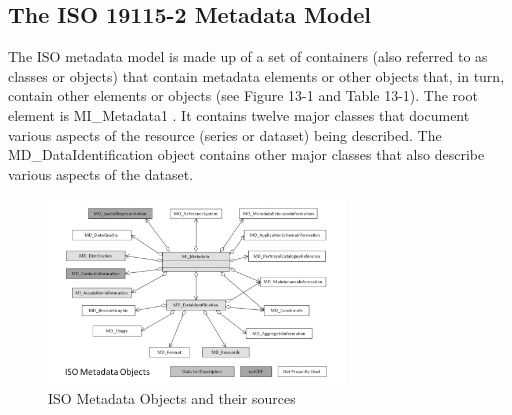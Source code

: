 \subsection{The ISO 19115-2 Metadata Model}
The ISO metadata model is made up of a set of containers (also referred to as classes or objects)
that contain metadata elements or other objects that, in turn, contain other elements or objects (see
Figure 13-1 and Table 13-1). The root element is MI\_Metadata1 \footnotemark{}
. It contains twelve major classes that document
various aspects of the resource (series or dataset) being described. The MD\_DataIdentification object
contains other major classes that also describe various aspects of the dataset.
\newp {}

\begin{figure}[H]
\centering
\includegraphics[width=0.7\textwidth]{../images/iso_metadata_obj.png}
\caption{ISO Metadata Objects and their sources}
\label{fig:ISO_Metadata_Objects}
\end{figure}

